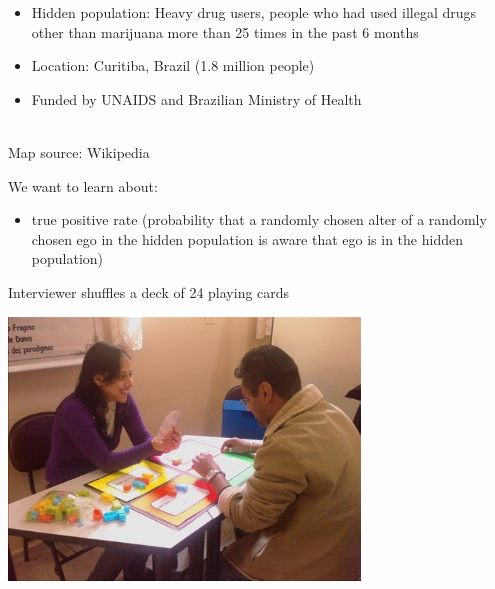 \documentclass[aspectratio=169]{beamer}
\begin{document}
\begin{frame}

\begin{itemize}
\item Hidden population: Heavy drug users, people who had used illegal drugs other than marijuana more than 25 times in the past 6 months
\item Location: Curitiba, Brazil (1.8 million people)
\item Funded by UNAIDS and Brazilian Ministry of Health
\end{itemize}

\\
\tiny{Map source: Wikipedia}

\end{frame}
\begin{frame}

We want to learn about:
\begin{itemize}
\item true positive rate (probability that a randomly chosen alter of a randomly chosen ego in the hidden population is aware that ego is in the hidden population) \pause
\end{itemize}

\end{frame}
\begin{frame}

Interviewer shuffles a deck of 24 playing cards
\vfill
\begin{center}
\includegraphics[angle=90, width=0.7\textwidth]{figures/jogo_drawcards}
\end{center}

\end{frame}
\end{document}
